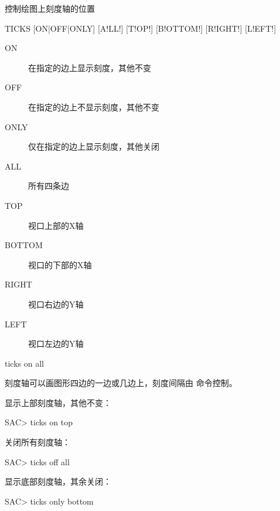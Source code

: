 \label{cmd:ticks}

控制绘图上刻度轴的位置

\begin{SACSTX}
TICKS [ON|OFF|ONLY] [A!LL!] [T!OP!] [B!OTTOM!] [R!IGHT!] [L!EFT!]
\end{SACSTX}

\begin{description}
\item [ON] 在指定的边上显示刻度，其他不变
\item [OFF] 在指定的边上不显示刻度，其他不变
\item [ONLY] 仅在指定的边上显示刻度，其他关闭
\item [ALL] 所有四条边
\item [TOP] 视口上部的X轴
\item [BOTTOM] 视口的下部的X轴
\item [RIGHT] 视口右边的Y轴
\item [LEFT] 视口左边的Y轴
\end{description}

\begin{SACDFT}
ticks on all
\end{SACDFT}

刻度轴可以画图形四边的一边或几边上，刻度间隔由  命令控制。

显示上部刻度轴，其他不变：
\begin{SACCode}
SAC> ticks on top
\end{SACCode}

关闭所有刻度轴：
\begin{SACCode}
SAC> ticks off all
\end{SACCode}

显示底部刻度轴，其余关闭：
\begin{SACCode}
SAC> ticks only bottom
\end{SACCode}
